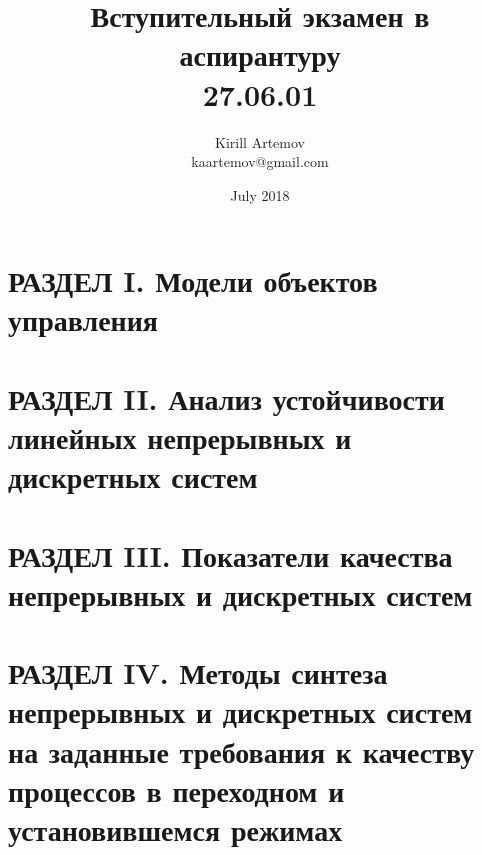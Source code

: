 \documentclass[14pt,a4paper]{article}
\title{\fontsize{26}{14}\selectfont\textbf{Вступительный экзамен в аспирантуру \\ 27.06.01}}
\author{Kirill Artemov \\ kaartemov@gmail.com}
\date{July 2018}
\begin{document}
\maketitle

\section*{\centering РАЗДЕЛ I. Модели объектов управления}













\section*{\centering РАЗДЕЛ II. Анализ устойчивости линейных непрерывных и дискретных систем}







\section*{\centering РАЗДЕЛ III. Показатели качества непрерывных и дискретных систем}





\section*{\centering РАЗДЕЛ IV. Методы синтеза непрерывных и дискретных систем на заданные требования к качеству процессов в переходном и установившемся режимах}







\end{document}
